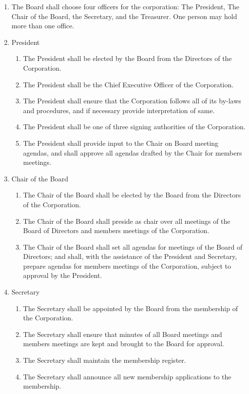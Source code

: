 \documentclass{article}
\begin{document}
\begin{enumerate}
\item The Board shall choose four officers for the corporation: The President, The Chair of the Board, the Secretary, and the Treasurer. One person may hold more than one office.
\item President
	\begin{enumerate}
	\item The President shall be elected by the Board from the Directors of the Corporation.
	\item The President shall be the Chief Executive Officer of the Corporation.
	\item The President shall ensure that the Corporation follows all of its by-laws and procedures, and if necessary provide interpretation of same.
	\item The President shall be one of three signing authorities of the Corporation.
	\item The President shall provide input to the Chair on Board meeting agendas, and shall approve all agendas drafted by the Chair for members meetings.
	\end{enumerate}
\item Chair of the Board
	\begin{enumerate}
	\item The Chair of the Board shall be elected by the Board from the Directors of the Corporation.
	\item The Chair of the Board shall preside as chair over all meetings of the Board of Directors and members meetings of the Corporation.
	\item The Chair of the Board shall set all agendas for meetings of the Board of Directors; and shall, with the assistance of the President and Secretary, prepare agendas for members meetings of the Corporation, subject to approval by the President.
	\end{enumerate}
\item Secretary
	\begin{enumerate}
	\item The Secretary shall be appointed by the Board from the membership of the Corporation.
	\item The Secretary shall ensure that minutes of all Board meetings and members meetings are kept and brought to the Board for approval.
	\item The Secretary shall maintain the membership register.
	\item The Secretary shall announce all new membership applications to the membership.

\end{enumerate}
\end{enumerate}
\end{document}
